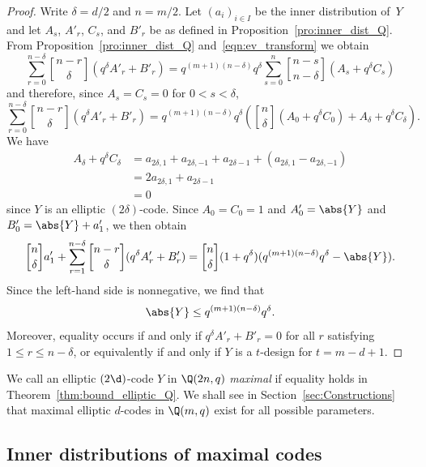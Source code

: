 \begin{proof}
Write $\delta=d/2$ and $n=m/2$. Let $(a_i)_{i\in I}$ be the inner distribution of~$Y$ and let $A_s$, $A'_r$, $C_s$, and $B'_r$ be as defined in Proposition~\ref{pro:inner_dist_Q}. From Proposition~\ref{pro:inner_dist_Q} and~\eqref{eqn:ev_transform} we obtain
\[
\sum_{r=0}^{n-\delta}\genfrac{[}{]}{0pt}{}{n-r}{\delta}(q^\delta A'_r+B'_r)=q^{(m+1)(n-\delta)}q^\delta\sum_{s=0}^n\genfrac{[}{]}{0pt}{}{n-s}{n-\delta}(A_s+q^\delta C_s)
\]
and therefore, since $A_s=C_s=0$ for $0<s<\delta$,
\[
\sum_{r=0}^{n-\delta}\genfrac{[}{]}{0pt}{}{n-r}{\delta}(q^\delta A'_r+B'_r)=q^{(m+1)(n-\delta)}q^\delta\left(\genfrac{[}{]}{0pt}{}{n}{\delta}(A_0+q^\delta C_0)+A_\delta+q^\delta C_\delta\right).
\]
We have
\begin{align*}
A_\delta+q^\delta C_\delta&=a_{2\delta,1}+a_{2\delta,-1}+a_{2\delta-1}+(a_{2\delta,1}-a_{2\delta,-1})\\
&=2a_{2\delta,1}+a_{2\delta-1}\\
&=0
\end{align*}
since $Y$ is an elliptic $(2\delta)$-code. Since $A_0=C_0=1$ and $A'_0=\abs{Y}$ and $B'_0=\abs{Y}+a'_1$, we then obtain
\[
\genfrac{[}{]}{0pt}{}{n}{\delta}a'_1+\sum_{r=1}^{n-\delta}\genfrac{[}{]}{0pt}{}{n-r}{\delta}(q^\delta A'_r+B'_r)=\genfrac{[}{]}{0pt}{}{n}{\delta}(1+q^\delta)(q^{(m+1)(n-\delta)}q^\delta-\abs{Y}).
\]
Since the left-hand side is nonnegative, we find that
\[
\abs{Y}\le q^{(m+1)(n-\delta)}q^\delta.%
\]
Moreover, equality occurs if and only if $q^\delta A'_r+B'_r=0$ for all $r$ satisfying $1\le r\le n-\delta$, or equivalently if and only if $Y$ is a $t$-design for $t=m-d+1$.
\end{proof}
We call an elliptic $(2\d)$-code $Y$ in $\Q(2n,q)$ \emph{maximal} if equality holds in Theorem~\ref{thm:bound_elliptic_Q}. We shall see in Section~\ref{sec:Constructions} that maximal elliptic $d$-codes in $\Q(m,q)$ exist for all possible parameters. 

%

\subsection{Inner distributions of maximal codes}

